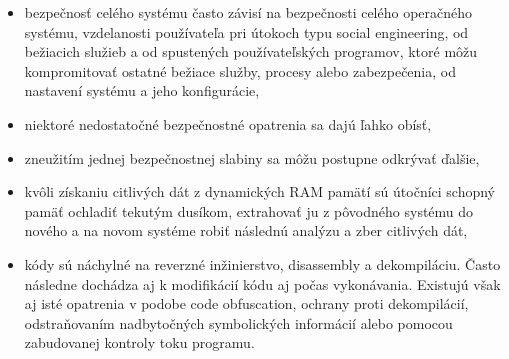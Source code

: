 \documentclass[12pt,a4paper,oneside,openright]{report}
\begin{document}
\begin{itemize}
\begin{itemize}
			\item bezpečnosť celého systému často závisí na bezpečnosti celého operačného systému, vzdelanosti používateľa pri útokoch typu social engineering, od bežiacich služieb a od spustených používateľských programov, ktoré môžu kompromitovať ostatné bežiace služby, procesy alebo zabezpečenia, od nastavení systému a jeho konfigurácie,
			\item niektoré nedostatočné bezpečnostné opatrenia sa dajú ľahko obísť,
			\item zneužitím jednej bezpečnostnej slabiny sa môžu postupne odkrývať ďalšie,
			\item kvôli získaniu citlivých dát z dynamických RAM pamätí sú útočníci schopný pamäť ochladiť tekutým dusíkom, extrahovať ju z pôvodného systému do nového a na novom systéme robiť následnú analýzu a zber citlivých dát,
			\item kódy sú náchylné na reverzné inžinierstvo, disassembly a dekompiláciu. Často následne dochádza aj k modifikácií kódu aj počas vykonávania. Existujú však aj isté opatrenia v podobe code obfuscation, ochrany proti dekompilácií, odstraňovaním nadbytočných symbolických informácií alebo pomocou zabudovanej kontroly toku programu.
		\end{itemize}
	\end{itemize}
	
\end{document}
